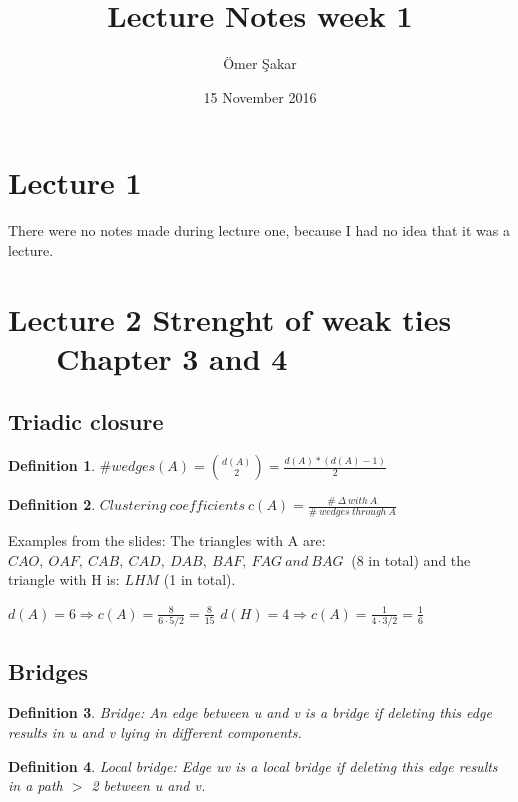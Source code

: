 \documentclass[12pt]{scrartcl}
\title{Lecture Notes week 1}
\author{\"Omer \c Sakar}
\date{15 November 2016}
\newtheorem{defi}{Definition}
\begin{document}
\maketitle
\tableofcontents
\newpage

\section{Lecture 1}
There were no notes made during lecture one, because I had no idea that it was a lecture.


\newpage
\section{Lecture 2 Strenght of weak ties \\ \ \ \ Chapter 3 and 4} 

\subsection{Triadic closure}
\begin{defi}
	$\#wedges(A) = \binom{d(A)}{2} = \frac{d(A)*(d(A)-1)}{2} $
\end{defi}

\begin{defi}
	$Clustering\ coefficients\ c(A) = \frac{\#\ \Delta\ with\ A}{\#\ wedges\ through\ A}$
\end{defi}

\noindent Examples from the slides: \newline
The triangles with A are: $CAO,\ OAF,\ CAB,\ CAD,\ DAB,\ BAF,\ FAG\ and\ BAG\ $ (8 in total) and the triangle with H is: $LHM$ (1 in total).

\noindent $d(A) = 6 \Rightarrow c(A) = \frac{8}{6\cdot 5/2} = \frac{8}{15}$ \newline 
$d(H) = 4 \Rightarrow c(A) = \frac{1}{4\cdot 3/2} = \frac{1}{6}$ \newline


\subsection{Bridges}
\begin{defi}
	Bridge: An edge between u and v is a bridge if deleting this edge results in u and v lying in different components.
\end{defi}
\begin{defi}
	Local bridge: Edge uv is a local bridge if deleting this edge results in a path $>$ 2 between u and v.
\end{defi}
\end{document}
